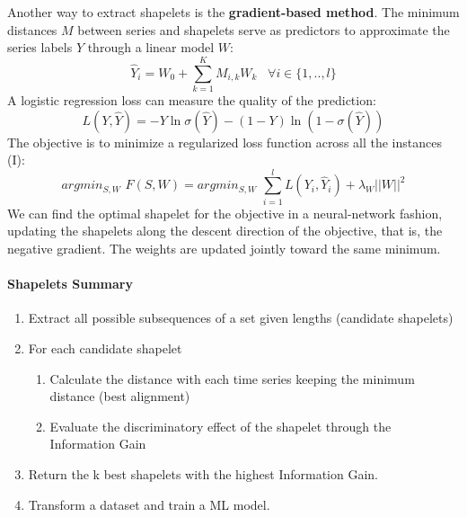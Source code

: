 Another way to extract shapelets is the \textbf{gradient-based method}. The minimum distances $M$ between series and shapelets serve as predictors to approximate the series labels $Y$ through a linear model $W$:
\begin{equation*}
    \hat{Y}_i = W_0 + \sum_{k=1}^KM_{i,k}W_k \;\;\; \forall i \in \{1,..,l\}
\end{equation*}
A logistic regression loss can measure the quality of the prediction:
\begin{equation*}
    L(Y,\hat{Y}) = -Y\ln \sigma (\hat{Y})-(1-Y)\ln(1-\sigma(\hat{Y}))
\end{equation*}
The objective is to minimize a regularized loss function across all the instances (I):
\begin{equation*}
   argmin_{S,W}\,\, F(S,W) = argmin_{S,W}\,\, \sum_{i=1}^l L(Y_i,\hat{Y}_i) + \lambda_W||W||^2
\end{equation*}
We can find the optimal shapelet for the objective in a neural-network fashion, updating the shapelets along the descent direction of the objective, that is, the negative gradient. The weights are updated jointly toward the same minimum.
\paragraph{Shapelets Summary}
\begin{enumerate}
 \item Extract all possible subsequences of a set given lengths (candidate shapelets)
 \item For each candidate shapelet
\begin{enumerate}
    \item Calculate the distance with each time series keeping the minimum distance (best alignment)
    \item Evaluate the discriminatory effect of the shapelet through the Information Gain
\end{enumerate}
 \item  Return the k best shapelets with the
highest Information Gain.
    \item  Transform a dataset and train a ML model.
\end{enumerate}